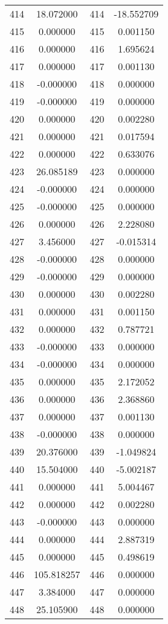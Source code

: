 \documentclass[12pt]{article}
\begin{document}
\begin{longtable}{@{}cccc@{}}
414 & 18.072000 & 414 & -18.552709 \\
415 & 0.000000 & 415 & 0.001150 \\
416 & 0.000000 & 416 & 1.695624 \\
417 & 0.000000 & 417 & 0.001130 \\
418 & -0.000000 & 418 & 0.000000 \\
419 & -0.000000 & 419 & 0.000000 \\
420 & 0.000000 & 420 & 0.002280 \\
421 & 0.000000 & 421 & 0.017594 \\
422 & 0.000000 & 422 & 0.633076 \\
423 & 26.085189 & 423 & 0.000000 \\
424 & -0.000000 & 424 & 0.000000 \\
425 & -0.000000 & 425 & 0.000000 \\
426 & 0.000000 & 426 & 2.228080 \\
427 & 3.456000 & 427 & -0.015314 \\
428 & -0.000000 & 428 & 0.000000 \\
429 & -0.000000 & 429 & 0.000000 \\
430 & 0.000000 & 430 & 0.002280 \\
431 & 0.000000 & 431 & 0.001150 \\
432 & 0.000000 & 432 & 0.787721 \\
433 & -0.000000 & 433 & 0.000000 \\
434 & -0.000000 & 434 & 0.000000 \\
435 & 0.000000 & 435 & 2.172052 \\
436 & 0.000000 & 436 & 2.368860 \\
437 & 0.000000 & 437 & 0.001130 \\
438 & -0.000000 & 438 & 0.000000 \\
439 & 20.376000 & 439 & -1.049824 \\
440 & 15.504000 & 440 & -5.002187 \\
441 & 0.000000 & 441 & 5.004467 \\
442 & 0.000000 & 442 & 0.002280 \\
443 & -0.000000 & 443 & 0.000000 \\
444 & 0.000000 & 444 & 2.887319 \\
445 & 0.000000 & 445 & 0.498619 \\
446 & 105.818257 & 446 & 0.000000 \\
447 & 3.384000 & 447 & 0.000000 \\
448 & 25.105900 & 448 & 0.000000 \\

\end{longtable}
\end{document}
